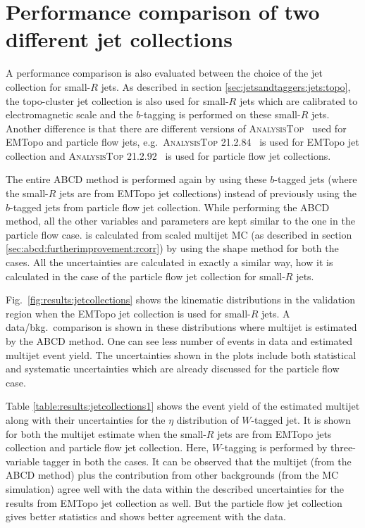 \section{Performance comparison of two different jet collections}
\label{sec:results:jetcollections}
A performance comparison is also evaluated between the choice of the jet collection for small-$R$ jets. As described in section \ref{sec:jetsandtaggers:jets:topo}, the topo-cluster jet collection is also used for small-$R$ jets which are calibrated to electromagnetic scale and the $b$-tagging is performed on these small-$R$ jets. Another difference is that there are different versions of \textsc{AnalysisTop}~\cite{analysistop} used for EMTopo and particle flow jets, e.g.\ \textsc{AnalysisTop 21.2.84}~\cite{analysistop} is used for EMTopo jet collection and \textsc{AnalysisTop 21.2.92}~\cite{analysistop} is used for particle flow jet collections. 

The entire ABCD method is performed again by using these $b$-tagged jets (where the small-$R$ jets are from EMTopo jet collections) instead of previously using the $b$-tagged jets from particle flow jet collection. While performing the ABCD method, all the other variables and parameters are kept similar to the one in the particle flow case. \R is calculated from scaled multijet MC (as described in section \ref{sec:abcd:furtherimprovement:rcorr}) by using the shape method for both the cases. All the uncertainties are calculated in exactly a similar way, how it is calculated in the case of the particle flow jet collection for small-$R$ jets.  

Fig.\ \ref{fig:results:jetcollections} shows the kinematic distributions in the validation region when the EMTopo jet collection is used for small-$R$ jets. A data/bkg.\ comparison is shown in these distributions where multijet is estimated by the ABCD method. One can see less number of events in data and estimated multijet event yield. The uncertainties shown in the plots include both statistical and systematic uncertainties which are already discussed for the particle flow case.

Table \ref{table:results:jetcollections1} shows the event yield of the estimated multijet along with their uncertainties for the $\eta$ distribution of $W$-tagged jet. It is shown for both the multijet estimate when the small-$R$ jets are from EMTopo jets collection and particle flow jet collection. Here, $W$-tagging is performed by three-variable tagger in both the cases. It can be observed that the multijet (from the ABCD method) plus the contribution from other backgrounds (from the MC simulation) agree well with the data within the described uncertainties for the results from EMTopo jet collection as well. But the particle flow jet collection gives better statistics and shows better agreement with the data. 

